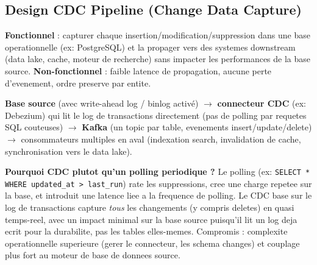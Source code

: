 \documentclass[11pt,a4paper]{article}
\newenvironment{sujet}[1]{%
  \subsection{#1}
}{%
  \bigskip
}
\begin{document}
\begin{sujet}{Design CDC Pipeline (Change Data Capture)}

\begin{req}
\textbf{Fonctionnel} : capturer chaque insertion/modification/suppression dans une base operationnelle (ex: PostgreSQL) et la propager vers des systemes downstream (data lake, cache, moteur de recherche) sans impacter les performances de la base source. \textbf{Non-fonctionnel} : faible latence de propagation, aucune perte d'evenement, ordre preserve par entite.
\end{req}

\begin{archbox}
\textbf{Base source} (avec write-ahead log / binlog activé) $\to$ \textbf{connecteur CDC} (ex: Debezium) qui lit le log de transactions directement (pas de polling par requetes SQL couteuses) $\to$ \textbf{Kafka} (un topic par table, evenements insert/update/delete) $\to$ consommateurs multiples en aval (indexation search, invalidation de cache, synchronisation vers le data lake).
\end{archbox}

\begin{tradeoff}
\textbf{Pourquoi CDC plutot qu'un polling periodique ?} Le polling (ex: \texttt{SELECT * WHERE updated\_at > last\_run}) rate les suppressions, cree une charge repetee sur la base, et introduit une latence liee a la frequence de polling. Le CDC base sur le log de transactions capture \emph{tous} les changements (y compris deletes) en quasi temps-reel, avec un impact minimal sur la base source puisqu'il lit un log deja ecrit pour la durabilite, pas les tables elles-memes. Compromis : complexite operationnelle superieure (gerer le connecteur, les schema changes) et couplage plus fort au moteur de base de donnees source.
\end{tradeoff}

\end{sujet}
\end{document}
